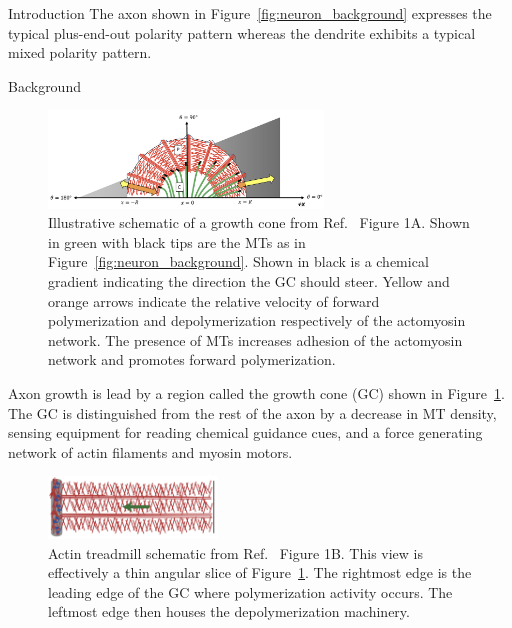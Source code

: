 \documentclass{beamer}
\newlength{\colwidth}
\begin{document}
\begin{frame}[t]
\begin{columns}[t]
\begin{column}{\colwidth}
\begin{block}{Introduction}
The axon shown in Figure~\ref{fig:neuron_background} expresses the typical plus-end-out polarity pattern whereas the dendrite exhibits a typical mixed polarity pattern.

\end{block}

\begin{block}{Background}

\begin{figure}
    \centering
    \includegraphics[width=0.65\textwidth]{figures/introduction/gc_crag_1a.png}
    \caption{\label{fig:gc_craig}
        Illustrative schematic of a growth cone from Ref.~\cite{craig_model_2018} Figure 1A. Shown in green with black tips are the MTs as in Figure~\ref{fig:neuron_background}. Shown in black is a chemical gradient indicating the direction the GC should steer. Yellow and orange arrows indicate the relative velocity of forward polymerization and depolymerization respectively of the actomyosin network. The presence of MTs increases adhesion of the actomyosin network and promotes forward polymerization.
    }
\end{figure}

Axon growth is lead by a region called the growth cone (GC) shown in Figure~\ref{fig:gc_craig}. The GC is distinguished from the rest of the axon by a decrease in MT density, sensing equipment for reading chemical guidance cues, and a force generating network of actin filaments and myosin motors.

\begin{figure}
    \centering
    \includegraphics[width=0.4\textwidth]{figures/introduction/actin_treadmill.png}
    \caption{\label{fig:actin_craig}
        Actin treadmill schematic from Ref.~\cite{craig_membrane_2012} Figure 1B. This view is effectively a thin angular slice of Figure~\ref{fig:gc_craig}. The rightmost edge is the leading edge of the GC where polymerization activity occurs. The leftmost edge then houses the depolymerization machinery.
    }
\end{figure}


\end{block}
\end{column}
\end{columns}
\end{frame}
\end{document}
